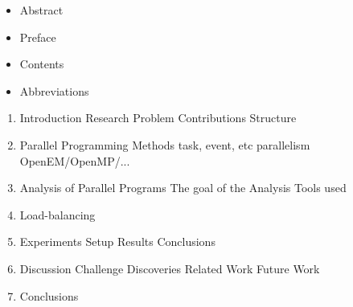 \begin{itemize}
\item Abstract
\item Preface
\item Contents
\item Abbreviations
\end{itemize}

\begin{enumerate}
\item Introduction
  \subitem Research Problem
  \subitem Contributions
  \subitem Structure

\item Parallel Programming Methods
  \subitem task, event, etc parallelism
  \subitem OpenEM/OpenMP/...

\item Analysis of Parallel Programs
  \subitem The goal of the Analysis
  \subitem Tools used

\item Load-balancing

\item Experiments
  \subitem Setup
  \subitem Results
  \subitem Conclusions
\item Discussion
  \subitem Challenge
  \subitem Discoveries
  \subitem Related Work
  \subitem Future Work
\item Conclusions
\end{enumerate}

